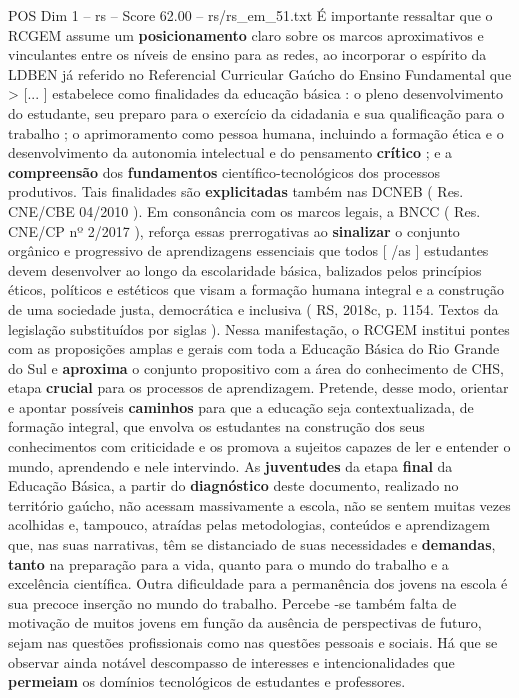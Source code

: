 \begin{textsample}{POS Dim 1 – rs – Score 62.00 – rs/rs\_em\_51.txt}
É importante ressaltar que o RCGEM assume um \textbf{posicionamento} claro sobre os marcos aproximativos e vinculantes entre os níveis de ensino para as redes, ao incorporar o espírito da LDBEN já referido no Referencial Curricular Gaúcho do Ensino Fundamental que > [... ] estabelece como finalidades da educação básica : o pleno desenvolvimento do estudante, seu preparo para o exercício da cidadania e sua qualificação para o trabalho ; o aprimoramento como pessoa humana, incluindo a formação ética e o desenvolvimento da autonomia intelectual e do pensamento \textbf{crítico} ; e a \textbf{compreensão} dos \textbf{fundamentos} científico-tecnológicos dos processos produtivos.
Tais finalidades são \textbf{explicitadas} também nas DCNEB ( Res.
CNE/CBE 04/2010 ).
Em consonância com os marcos legais, a BNCC ( Res.
CNE/CP nº 2/2017 ), reforça essas prerrogativas ao \textbf{sinalizar} o conjunto orgânico e progressivo de aprendizagens essenciais que todos [ /as ] estudantes devem desenvolver ao longo da escolaridade básica, balizados pelos princípios éticos, políticos e estéticos que visam a formação humana integral e a construção de uma sociedade justa, democrática e inclusiva ( RS, 2018c, p. 1154.
Textos da legislação substituídos por siglas ).
Nessa manifestação, o RCGEM institui pontes com as proposições amplas e gerais com toda a Educação Básica do Rio Grande do Sul e \textbf{aproxima} o conjunto propositivo com a área do conhecimento de CHS, etapa \textbf{crucial} para os processos de aprendizagem.
Pretende, desse modo, orientar e apontar possíveis \textbf{caminhos} para que a educação seja contextualizada, de formação integral, que envolva os estudantes na construção dos seus conhecimentos com criticidade e os promova a sujeitos capazes de ler e entender o mundo, aprendendo e nele intervindo.
As \textbf{juventudes} da etapa \textbf{final} da Educação Básica, a partir do \textbf{diagnóstico} deste documento, realizado no território gaúcho, não acessam massivamente a escola, não se sentem muitas vezes acolhidas e, tampouco, atraídas pelas metodologias, conteúdos e aprendizagem que, nas suas narrativas, têm se distanciado de suas necessidades e \textbf{demandas}, \textbf{tanto} na preparação para a vida, quanto para o mundo do trabalho e a excelência científica.
Outra dificuldade para a permanência dos jovens na escola é sua precoce inserção no mundo do trabalho.
Percebe -se também falta de motivação de muitos jovens em função da ausência de perspectivas de futuro, sejam nas questões profissionais como nas questões pessoais e sociais.
Há que se observar ainda notável descompasso de interesses e intencionalidades que \textbf{permeiam} os domínios tecnológicos de estudantes e professores.

\end{textsample}
